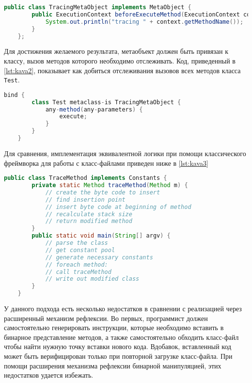\begin{lstlisting}[language=Java, caption=Объявление метаобъекта в \texttt{Kava}, label=lst:kava1]
    public class TracingMetaObject implements MetaObject {
        public ExecutionContext beforeExecuteMethod(ExecutionContext context) {
            System.out.println("tracing " + context.getMethodName());
        }
    };
\end{lstlisting}

Для достижения желаемого результата, метаобъект должен быть привязан к классу, вызов методов которого необходимо отслеживать. Код, приведенный в \autoref{lst:kava2}, показывает как добиться отслеживания вызовов всех методов класса \texttt{Test}.

\begin{lstlisting}[language=Java, caption=Привязка класса к метаобъекту в \texttt{Kava}, label=lst:kava2]
    bind {
        class Test metaclass-is TracingMetaObject {
            any-method(any-parameters) {
                execute;
            }
        }
    }
\end{lstlisting}

Для сравнения, имплементация эквивалентной логики при помощи классического фреймворка для работы с класс-файлами приведен ниже в \autoref{lst:kava3}

\begin{lstlisting}[language=Java, caption=Реализация аналогичной функциональности при помощи классического фреймворка для работы с класс-файлом, label=lst:kava3]
    public class TraceMethod implements Constants {
        private static Method traceMethod(Method m) {
            // create the byte code to insert
            // find insertion point
            // insert byte code at beginning of method
            // recalculate stack size
            // return modified method
        }
        public static void main(String[] argv) {
            // parse the class
            // get constant pool
            // generate necessary constants
            // foreach method:
            // call traceMethod
            // write out modified class
        }
    }
\end{lstlisting}

У данного подхода есть несколько недостатков в сравнении с реализацией через расширенный механизм рефлексии. Во первых, программист должен самостоятельно генерировать инструкции, которые необходимо вставить в бинарное представление методов, а также самостоятельно обходить класс-файл чтобы найти нужную точку вставки нового кода. Вдобавок, вставленный код может быть верифицирован только при повторной загрузке класс-файла. При помощи расширения механизма рефлексии бинарной манипуляцией, этих недостатков удается избежать.

